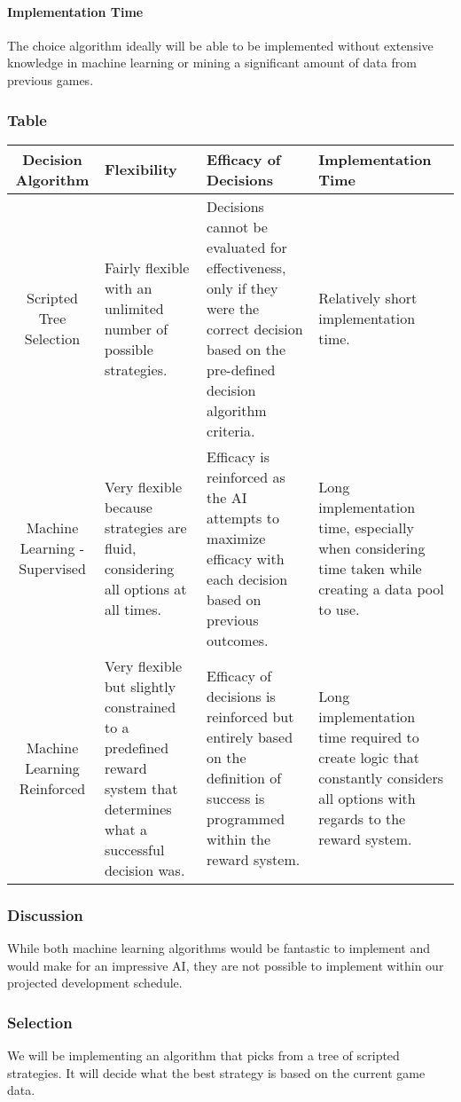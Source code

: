 \paragraph{Implementation Time}
The choice algorithm ideally will be able to be implemented without extensive knowledge in machine learning or mining a significant amount of data from previous games.
\subsubsection{Table}
\begin{center}
	\begin{tabular}{ ||C|M|M|M|| } 
		\hline
		Decision Algorithm & Flexibility & Efficacy of Decisions & Implementation Time \\
		\hline
		Scripted Tree Selection & Fairly flexible with an unlimited number of possible strategies. & Decisions cannot be evaluated for effectiveness, only if they were the correct decision based on the pre-defined decision algorithm criteria. & Relatively short implementation time. \\ 
		\hline
		Machine Learning - Supervised & Very flexible because strategies are fluid, considering all options at all times. & Efficacy is reinforced as the AI attempts to maximize efficacy with each decision based on previous outcomes. & Long implementation time, especially when considering time taken while creating a data pool to use. \\ 
		\hline
		 Machine Learning Reinforced & Very flexible but slightly constrained to a predefined reward system that determines what a successful decision was. & Efficacy of decisions is reinforced but entirely based on the definition of success is programmed within the reward system. & Long implementation time required to create logic that constantly considers all options with regards to the reward system. \\ 
		\hline
	\end{tabular}
\end{center}
\subsubsection{Discussion}
While both machine learning algorithms would be fantastic to implement and would make for an impressive AI, they are not possible to implement within our projected development schedule. 
\subsubsection{Selection}
We will be implementing an algorithm that picks from a tree of scripted strategies. It will decide what the best strategy is based on the current game data.


